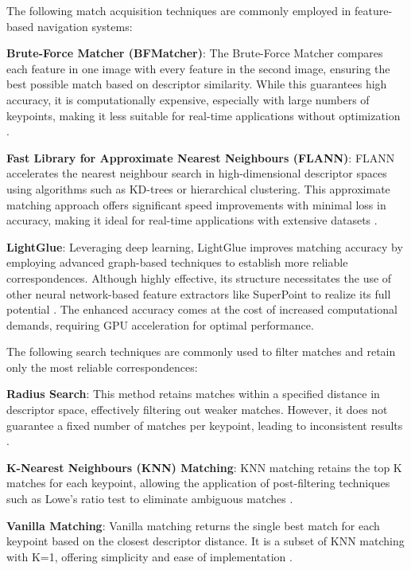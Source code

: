 The following match acquisition techniques are commonly employed in feature-based navigation systems:

\textbf{Brute-Force Matcher (BFMatcher)}: The Brute-Force Matcher compares each feature in one image with every feature in the second image, ensuring the best possible match based on descriptor similarity. While this guarantees high accuracy, it is computationally expensive, especially with large numbers of keypoints, making it less suitable for real-time applications without optimization \cite{opencv_bfmatcher}.

\textbf{Fast Library for Approximate Nearest Neighbours (FLANN)}: FLANN accelerates the nearest neighbour search in high-dimensional descriptor spaces using algorithms such as KD-trees or hierarchical clustering. This approximate matching approach offers significant speed improvements with minimal loss in accuracy, making it ideal for real-time applications with extensive datasets \cite{opencv_flann_tutorial}.

\textbf{LightGlue}: Leveraging deep learning, LightGlue improves matching accuracy by employing advanced graph-based techniques to establish more reliable correspondences. Although highly effective, its structure necessitates the use of other neural network-based feature extractors like SuperPoint to realize its full potential \cite{cvg2023lightglue}. The enhanced accuracy comes at the cost of increased computational demands, requiring GPU acceleration for optimal performance.

The following search techniques are commonly used to filter matches and retain only the most reliable correspondences:

\textbf{Radius Search}: This method retains matches within a specified distance in descriptor space, effectively filtering out weaker matches. However, it does not guarantee a fixed number of matches per keypoint, leading to inconsistent results \cite{opencv_matcher_tutorial}.

\textbf{K-Nearest Neighbours (KNN) Matching}: KNN matching retains the top K matches for each keypoint, allowing the application of post-filtering techniques such as Lowe’s ratio test to eliminate ambiguous matches \cite{opencv_matcher_tutorial}.

\textbf{Vanilla Matching}: Vanilla matching returns the single best match for each keypoint based on the closest descriptor distance. It is a subset of KNN matching with K=1, offering simplicity and ease of implementation \cite{opencv_matcher_tutorial}.


